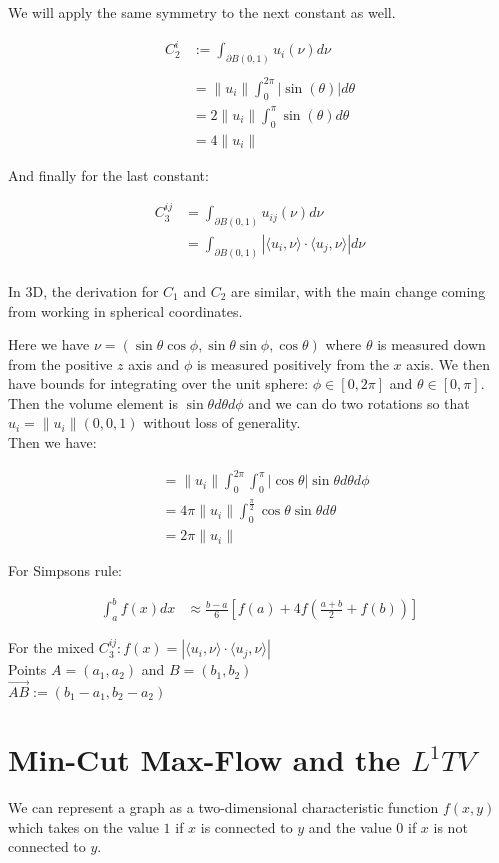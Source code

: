 \documentclass[12pt]{article}
\begin{document}
We will apply the same symmetry to the next constant as well.

\begin{align*}
C_2^{i} &:= \int_{\partial B(0,1)} u_i(\nu)d\nu\\\\
&= \|u_i\| \int_0^{2\pi} |\sin(\theta)|d\theta\\
&= 2 \|u_i\| \int_0^\pi \sin(\theta)d\theta\\
&= 4 \|u_i\|
\end{align*}

And finally for the last constant:

\begin{align*}
C_3^{ij} &= \int_{\partial B(0,1)}u_{ij}(\nu)d\nu\\
&= \int_{\partial B(0,1)} |\langle u_i, \nu \rangle \cdot \langle u_j, \nu \rangle| d\nu\\
\end{align*}

In 3D, the derivation for $C_1$ and $C_2$ are similar, with the main change coming from working in spherical coordinates.

Here we have $\nu = (\sin \theta \cos \phi, \sin \theta \sin \phi, \cos \theta)$ where $\theta$ is measured down from the positive $z$ axis and $\phi$ is measured positively from the $x$ axis. We then have bounds for integrating over the unit sphere: $\phi \in [0,2\pi]$ and $\theta \in [0,\pi]$. Then the volume element is $\sin \theta d\theta d\phi$ and we can do two rotations so that $u_i = \| u_i \|(0,0,1)$ without loss of generality.\\

Then we have:

\begin{align*}
	&= \|u_i \| \int_0^{2\pi} \int_0^\pi |\cos \theta| \sin \theta d\theta d\phi\\
	&= 4 \pi \| u_i \| \int_0^{\frac{\pi}{2}}\cos \theta \sin \theta d\theta\\
	&= 2\pi \|u_i\| 
\end{align*}

For Simpsons rule:

\begin{align*}
\int_a^b f(x) dx &\approx \frac{b-a}{6}\left[f(a) + 4f\left(\frac{a+b}{2} +f(b)\right) \right]
\end{align*}

For the mixed $C_3^{ij}: f(x) = |\langle u_i, \nu \rangle \cdot \langle u_j, \nu \rangle|$\\

Points $A = (a_1,a_2)$ and $B = (b_1,b_2)$\\

$\vec{AB}:= (b_1-a_1,b_2-a_2)$

\section{Min-Cut Max-Flow and the $L^1TV$}

We can represent a graph as a two-dimensional characteristic function $f(x,y)$ which takes on the value $1$ if $x$ is connected to $y$ and the value $0$ if $x$ is not connected to $y$. 
\end{document}
